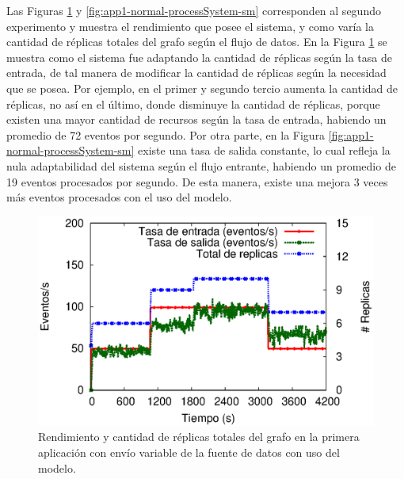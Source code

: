 Las Figuras \ref{fig:app1-normal-processSystem-cm} y \ref{fig:app1-normal-processSystem-sm} \normalsize{corresponden al segundo experimento y muestra el rendimiento que posee el sistema, y como varía la cantidad de réplicas totales del grafo según el flujo de datos.} En la Figura \ref{fig:app1-normal-processSystem-cm} \normalsize{se muestra como el sistema fue adaptando la cantidad de réplicas según la tasa de entrada, de tal manera de modificar la cantidad de réplicas según la necesidad que se posea. Por ejemplo, en el primer y segundo tercio aumenta la cantidad de réplicas, no así en el último, donde disminuye la cantidad de réplicas, porque existen una mayor cantidad de recursos según la tasa de entrada, habiendo un promedio de 72 eventos por segundo.} Por otra parte, en la Figura \ref{fig:app1-normal-processSystem-sm} \normalsize{existe una tasa de salida constante, lo cual refleja la nula adaptabilidad del sistema según el flujo entrante, habiendo un promedio de 19 eventos procesados por segundo. De esta manera, existe una mejora 3 veces más eventos procesados con el uso del modelo.}

\begin{figure}[!ht]
	\centering
	\includegraphics[scale=0.7]{images/exp/app1/normal/cm/processSystem.eps}
    \caption{Rendimiento y cantidad de réplicas totales del grafo en la primera aplicación con envío variable de la fuente de datos con uso del modelo.}
	\label{fig:app1-normal-processSystem-cm}
\end{figure}

